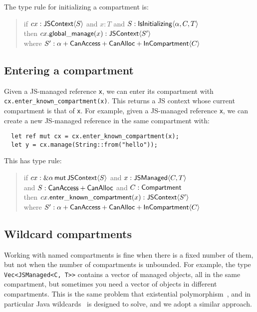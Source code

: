The type rule for initializing a compartment is:
\begin{quote}
  if $cx: \mathsf{JSContext}\langle S\rangle$
  and $x: T$
  and $S: \mathsf{IsInitializing}\langle \alpha,C,T\rangle$ \\
  then $cx.\mathsf{global\_manage}(x) : \mathsf{JSContext}\langle S'\rangle$ \\\mbox{}\quad
  where $S': \alpha + \mathsf{CanAccess} + \mathsf{CanAlloc} + \mathsf{InCompartment}\langle C\rangle$
\end{quote}

\subsection{Entering a compartment}
\label{sec:compartment-entering}

Given a JS-managed reference \verb|x|, we can enter its compartment with \verb|cx.enter_known_compartment(x)|.
This returns a JS context whose current compartment is that of \verb|x|.
For example, given a JS-managed reference \verb|x|,
we can create a new JS-managed reference in the same compartment with:
\begin{verbatim}
  let ref mut cx = cx.enter_known_compartment(x);
  let y = cx.manage(String::from("hello"));
\end{verbatim}
This has type rule:
\begin{quote}
  if $cx: \&\alpha\,\mathsf{mut}\,{\mathsf{JSContext}\langle S\rangle}$
  and $x: \mathsf{JSManaged}\langle C,T\rangle$ \\
  and $S: \mathsf{CanAccess} + \mathsf{CanAlloc}$
  and $C: \mathsf{Compartment}$ \\
  then $cx.\mathsf{enter\_known\_compartment}(x) : \mathsf{JSContext}\langle S'\rangle$ \\\mbox{}\quad
  where $S': \alpha + \mathsf{CanAccess} + \mathsf{CanAlloc} + \mathsf{InCompartment}\langle C\rangle$
\end{quote}

\subsection{Wildcard compartments}
\label{sec:compartment-wildcard}

Working with named compartments is fine when there is a fixed number of
them, but not when the number of compartments is unbounded. For
example, the type \verb|Vec<JSManaged<C, T>>| contains a vector of managed
objects, all in the same compartment, but sometimes you need a vector
of objects in different compartments. This is the same problem that
existential polymorphism~\cite{expoly}, and in particular
Java wildcards~\cite[\S8.1.2]{jls} is designed to solve, and we adopt
a similar approach.

